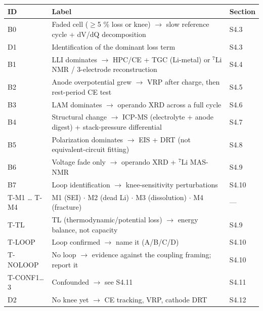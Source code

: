\documentclass[11pt,a4paper]{article}
\renewcommand{\arraystretch}{1.15}
\begin{document}
\begingroup\small
\setlength{\tabcolsep}{3pt}
\renewcommand{\arraystretch}{1.12}
\sloppy
\begin{longtable}{@{}>{\raggedright\arraybackslash}p{}>{\raggedright\arraybackslash}p{}>{\raggedright\arraybackslash}p{}@{}}
\hline
\textbf{ID} & \textbf{Label} & \textbf{Section} \\ \hline
\endhead
B0 & Faded cell (\ensuremath{\geq}5 \% loss or knee) \ensuremath{\rightarrow} slow reference cycle + dV/dQ decomposition & S4.3 \\
D1 & Identification of the dominant loss term & S4.3 \\
B1 & LLI dominates \ensuremath{\rightarrow} HPC/CE + TGC (Li-metal) or \ensuremath{^{7}}Li NMR / 3-electrode reconstruction & S4.4 \\
B2 & Anode overpotential grew \ensuremath{\rightarrow} VRP after charge, then rest-period CE test & S4.5 \\
B3 & LAM dominates \ensuremath{\rightarrow} operando XRD across a full cycle & S4.6 \\
B4 & Structural change \ensuremath{\rightarrow} ICP-MS (electrolyte + anode digest) + stack-pressure differential & S4.7 \\
B5 & Polarization dominates \ensuremath{\rightarrow} EIS + DRT (not equivalent-circuit fitting) & S4.8 \\
B6 & Voltage fade only \ensuremath{\rightarrow} operando XRD + \ensuremath{^{7}}Li MAS-NMR & S4.9 \\
B7 & Loop identification \ensuremath{\rightarrow} knee-sensitivity perturbations & S4.10 \\
T-M1 \ldots{} T-M4 & M1 (SEI) \ensuremath{\cdot} M2 (dead Li) \ensuremath{\cdot} M3 (dissolution) \ensuremath{\cdot} M4 (fracture) & --- \\
T-TL & TL (thermodynamic/potential loss) \ensuremath{\rightarrow} energy balance, not capacity & S4.9 \\
T-LOOP & Loop confirmed \ensuremath{\rightarrow} name it (A/B/C/D) & S4.10 \\
T-NOLOOP & No loop \ensuremath{\rightarrow} evidence against the coupling framing; report it & S4.10 \\
T-CONF1\ldots{}3 & Confounded \ensuremath{\rightarrow} see S4.11 & S4.11 \\
D2 & No knee yet \ensuremath{\rightarrow} CE tracking, VRP, cathode DRT & S4.12 \\
\hline
\end{longtable}
\endgroup
\end{document}
